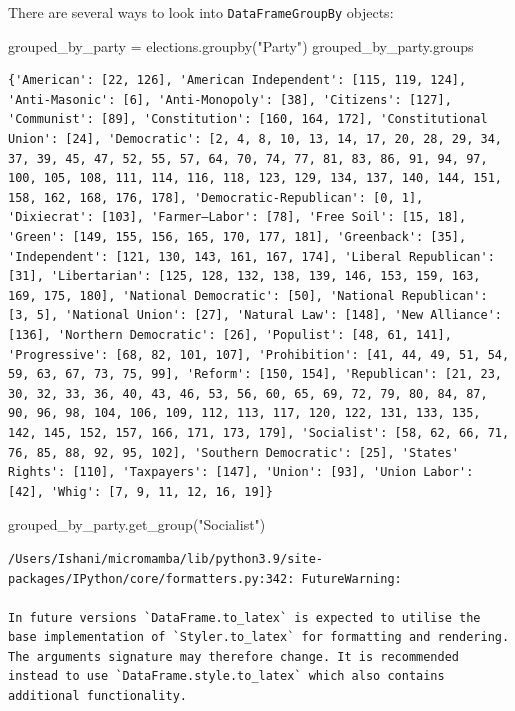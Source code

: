 \documentclass[
  letterpaper,
  DIV=11,
  numbers=noendperiod]{scrreprt}
\newenvironment{Shaded}{\begin{snugshade}}{\end{snugshade}}
\newcommand{\NormalTok}[1]{\textcolor[rgb]{0.00,0.23,0.31}{#1}}
\newcommand{\OperatorTok}[1]{\textcolor[rgb]{0.37,0.37,0.37}{#1}}
\newcommand{\StringTok}[1]{\textcolor[rgb]{0.13,0.47,0.30}{#1}}
\begin{document}
There are several ways to look into \texttt{DataFrameGroupBy} objects:

\begin{Shaded}
\begin{Highlighting}[]
\NormalTok{grouped\_by\_party }\OperatorTok{=}\NormalTok{ elections.groupby(}\StringTok{"Party"}\NormalTok{)}
\NormalTok{grouped\_by\_party.groups}
\end{Highlighting}
\end{Shaded}

\begin{verbatim}
{'American': [22, 126], 'American Independent': [115, 119, 124], 'Anti-Masonic': [6], 'Anti-Monopoly': [38], 'Citizens': [127], 'Communist': [89], 'Constitution': [160, 164, 172], 'Constitutional Union': [24], 'Democratic': [2, 4, 8, 10, 13, 14, 17, 20, 28, 29, 34, 37, 39, 45, 47, 52, 55, 57, 64, 70, 74, 77, 81, 83, 86, 91, 94, 97, 100, 105, 108, 111, 114, 116, 118, 123, 129, 134, 137, 140, 144, 151, 158, 162, 168, 176, 178], 'Democratic-Republican': [0, 1], 'Dixiecrat': [103], 'Farmer–Labor': [78], 'Free Soil': [15, 18], 'Green': [149, 155, 156, 165, 170, 177, 181], 'Greenback': [35], 'Independent': [121, 130, 143, 161, 167, 174], 'Liberal Republican': [31], 'Libertarian': [125, 128, 132, 138, 139, 146, 153, 159, 163, 169, 175, 180], 'National Democratic': [50], 'National Republican': [3, 5], 'National Union': [27], 'Natural Law': [148], 'New Alliance': [136], 'Northern Democratic': [26], 'Populist': [48, 61, 141], 'Progressive': [68, 82, 101, 107], 'Prohibition': [41, 44, 49, 51, 54, 59, 63, 67, 73, 75, 99], 'Reform': [150, 154], 'Republican': [21, 23, 30, 32, 33, 36, 40, 43, 46, 53, 56, 60, 65, 69, 72, 79, 80, 84, 87, 90, 96, 98, 104, 106, 109, 112, 113, 117, 120, 122, 131, 133, 135, 142, 145, 152, 157, 166, 171, 173, 179], 'Socialist': [58, 62, 66, 71, 76, 85, 88, 92, 95, 102], 'Southern Democratic': [25], 'States' Rights': [110], 'Taxpayers': [147], 'Union': [93], 'Union Labor': [42], 'Whig': [7, 9, 11, 12, 16, 19]}
\end{verbatim}

\begin{Shaded}
\begin{Highlighting}[]
\NormalTok{grouped\_by\_party.get\_group(}\StringTok{"Socialist"}\NormalTok{)}
\end{Highlighting}
\end{Shaded}

\begin{verbatim}
/Users/Ishani/micromamba/lib/python3.9/site-packages/IPython/core/formatters.py:342: FutureWarning:

In future versions `DataFrame.to_latex` is expected to utilise the base implementation of `Styler.to_latex` for formatting and rendering. The arguments signature may therefore change. It is recommended instead to use `DataFrame.style.to_latex` which also contains additional functionality.
\end{verbatim}
\end{document}
